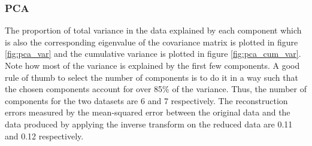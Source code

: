 \documentclass[letterpaper]{article}
\begin{document}
	\subsubsection{PCA}
	The proportion of total variance in the data explained by each component which is also the corresponding eigenvalue of the covariance matrix is plotted in figure \ref{fig:pca_var} and the cumulative variance is plotted in figure \ref{fig:pca_cum_var}. Note how most of the variance is explained by the first few components. A good rule of thumb to select the number of components is to do it in a way such that the chosen components account for over 85\% of the variance. Thus, the number of components for the two datasets are 6 and 7 respectively. The reconstruction errors measured by the mean-squared error between the original data and the data produced by applying the inverse transform on the reduced data are 0.11 and 0.12 respectively.
	
\end{document}
